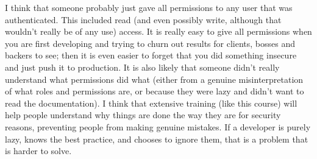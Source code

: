 \documentclass[11pt]{article}
\begin{document}
I think that someone probably just gave all permissions to any user that was authenticated. This included read (and even possibly write, although that wouldn't really be of any use) access. It is really easy to give all permissions when you are first developing and trying to churn out results for clients, bosses and backers to see; then it is even easier to forget that you did something insecure and just push it to production. It is also likely that someone didn't really understand what permissions did what (either from a genuine misinterpretation of what roles and permissions are, or because they were lazy and didn't want to read the documentation). I think that extensive training (like this course) will help people understand why things are done the way they are for security reasons, preventing people from making genuine mistakes. If a developer is purely lazy, knows the best practice, and chooses to ignore them, that is a problem that is harder to solve.
\end{document}
